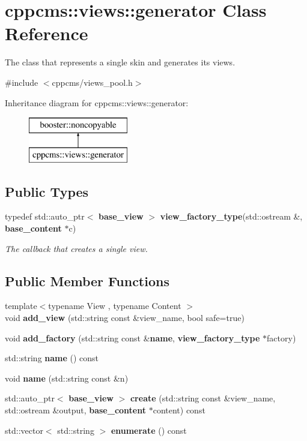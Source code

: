 \section{cppcms\+:\+:views\+:\+:generator Class Reference}
\label{classcppcms_1_1views_1_1generator}


The class that represents a single skin and generates its views.  




{\ttfamily \#include $<$cppcms/views\+\_\+pool.\+h$>$}

Inheritance diagram for cppcms\+:\+:views\+:\+:generator\+:\begin{figure}[H]
\begin{center}
\leavevmode
\includegraphics[height=2.000000cm]{classcppcms_1_1views_1_1generator}
\end{center}
\end{figure}
\subsection*{Public Types}
\begin{DoxyCompactItemize}
\item 
typedef std\+::auto\+\_\+ptr$<$ {\bf base\+\_\+view} $>$ {\bf view\+\_\+factory\+\_\+type}(std\+::ostream \&, {\bf base\+\_\+content} $\ast$c)\label{classcppcms_1_1views_1_1generator_af51d091d42138b8c06fbc2cba5d71c83}

\begin{DoxyCompactList}\small\item\em The callback that creates a single view. \end{DoxyCompactList}\end{DoxyCompactItemize}
\subsection*{Public Member Functions}
\begin{DoxyCompactItemize}
\item 
{\footnotesize template$<$typename View , typename Content $>$ }\\void {\bf add\+\_\+view} (std\+::string const \&view\+\_\+name, bool safe=true)
\item 
void {\bf add\+\_\+factory} (std\+::string const \&{\bf name}, {\bf view\+\_\+factory\+\_\+type} $\ast$factory)
\item 
std\+::string {\bf name} () const 
\item 
void {\bf name} (std\+::string const \&n)
\item 
std\+::auto\+\_\+ptr$<$ {\bf base\+\_\+view} $>$ {\bf create} (std\+::string const \&view\+\_\+name, std\+::ostream \&output, {\bf base\+\_\+content} $\ast$content) const 
\item 
std\+::vector$<$ std\+::string $>$ {\bf enumerate} () const 
\end{DoxyCompactItemize}


